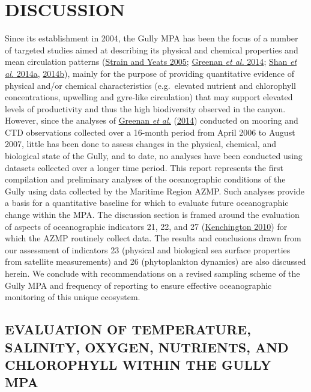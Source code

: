 \documentclass[12pt]{article}\usepackage[]{graphicx}\usepackage[]{color}
\begin{document}
\clearpage

\hypertarget{sec:discussion}{%
\section{DISCUSSION}\label{sec:discussion}}

Since its establishment in 2004, the Gully MPA has been the focus of a number of targeted studies aimed at describing its physical and chemical properties and mean circulation patterns (\protect\hyperlink{ref-strain_2005}{Strain and Yeats 2005}; \protect\hyperlink{ref-greenan_2014}{Greenan \textit{et al.} 2014}; \protect\hyperlink{ref-shan_2014a}{Shan \textit{et al.} 2014a}, \protect\hyperlink{ref-shan_2014b}{2014b}), mainly for the purpose of providing quantitative evidence of physical and/or chemical characteristics (e.g.~elevated nutrient and chlorophyll concentrations, upwelling and gyre-like circulation) that may support elevated levels of productivity and thus the high biodiversity observed in the canyon. However, since the analyses of \protect\hyperlink{ref-greenan_2014}{Greenan \textit{et al.}} (\protect\hyperlink{ref-greenan_2014}{2014}) conducted on mooring and CTD observations collected over a 16-month period from April 2006 to August 2007, little has been done to assess changes in the physical, chemical, and biological state of the Gully, and to date, no analyses have been conducted using datasets collected over a longer time period. This report represents the first compilation and preliminary analyses of the oceanographic conditions of the Gully using data collected by the Maritime Region AZMP. Such analyses provide a basis for a quantitative baseline for which to evaluate future oceanographic change within the MPA. The discussion section is framed around the evaluation of aspects of oceanographic indicators 21, 22, and 27 (\protect\hyperlink{ref-kenchington_2010}{Kenchington 2010}) for which the AZMP routinely collect data. The results and conclusions drawn from our assessment of indicators 23 (physical and biological sea surface properties from satellite measurements) and 26 (phytoplankton dynamics) are also discussed herein. We conclude with recommendations on a revised sampling scheme of the Gully MPA and frequency of reporting to ensure effective oceanographic monitoring of this unique ecosystem.

\hypertarget{evaluation-of-temperature-salinity-oxygen-nutrients-and-chlorophyll-within-the-gully-mpa}{%
\subsection{\texorpdfstring{\textbf{EVALUATION OF TEMPERATURE, SALINITY, OXYGEN, NUTRIENTS, AND CHLOROPHYLL WITHIN THE GULLY MPA}}{EVALUATION OF TEMPERATURE, SALINITY, OXYGEN, NUTRIENTS, AND CHLOROPHYLL WITHIN THE GULLY MPA}}\label{evaluation-of-temperature-salinity-oxygen-nutrients-and-chlorophyll-within-the-gully-mpa}}
\end{document}
